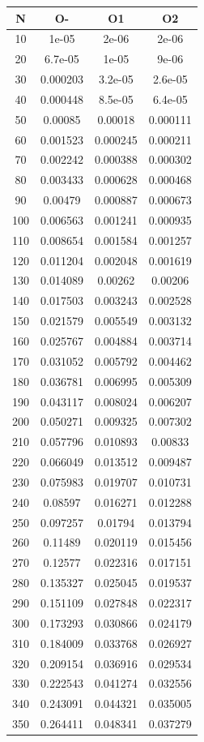 \begin{center}
\begin{tabular}{| c | c | c | c |}
\hline
\textbf{N} & \textbf{O-} & \textbf{O1} & \textbf{O2} \\ \hline
10 & 1e-05 & 2e-06 & 2e-06 \\ \hline
20 & 6.7e-05 & 1e-05 & 9e-06 \\ \hline
30 & 0.000203 & 3.2e-05 & 2.6e-05 \\ \hline
40 & 0.000448 & 8.5e-05 & 6.4e-05 \\ \hline
50 & 0.00085 & 0.00018 & 0.000111 \\ \hline
60 & 0.001523 & 0.000245 & 0.000211 \\ \hline
70 & 0.002242 & 0.000388 & 0.000302 \\ \hline
80 & 0.003433 & 0.000628 & 0.000468 \\ \hline
90 & 0.00479 & 0.000887 & 0.000673 \\ \hline
100 & 0.006563 & 0.001241 & 0.000935 \\ \hline
110 & 0.008654 & 0.001584 & 0.001257 \\ \hline
120 & 0.011204 & 0.002048 & 0.001619 \\ \hline
130 & 0.014089 & 0.00262 & 0.00206 \\ \hline
140 & 0.017503 & 0.003243 & 0.002528 \\ \hline
150 & 0.021579 & 0.005549 & 0.003132 \\ \hline
160 & 0.025767 & 0.004884 & 0.003714 \\ \hline
170 & 0.031052 & 0.005792 & 0.004462 \\ \hline
180 & 0.036781 & 0.006995 & 0.005309 \\ \hline
190 & 0.043117 & 0.008024 & 0.006207 \\ \hline
200 & 0.050271 & 0.009325 & 0.007302 \\ \hline
210 & 0.057796 & 0.010893 & 0.00833 \\ \hline
220 & 0.066049 & 0.013512 & 0.009487 \\ \hline
230 & 0.075983 & 0.019707 & 0.010731 \\ \hline
240 & 0.08597 & 0.016271 & 0.012288 \\ \hline
250 & 0.097257 & 0.01794 & 0.013794 \\ \hline
260 & 0.11489 & 0.020119 & 0.015456 \\ \hline
270 & 0.12577 & 0.022316 & 0.017151 \\ \hline
280 & 0.135327 & 0.025045 & 0.019537 \\ \hline
290 & 0.151109 & 0.027848 & 0.022317 \\ \hline
300 & 0.173293 & 0.030866 & 0.024179 \\ \hline
310 & 0.184009 & 0.033768 & 0.026927 \\ \hline
320 & 0.209154 & 0.036916 & 0.029534 \\ \hline
330 & 0.222543 & 0.041274 & 0.032556 \\ \hline
340 & 0.243091 & 0.044321 & 0.035005 \\ \hline
350 & 0.264411 & 0.048341 & 0.037279 \\ \hline
\hline
\end{tabular}
\end{center}
